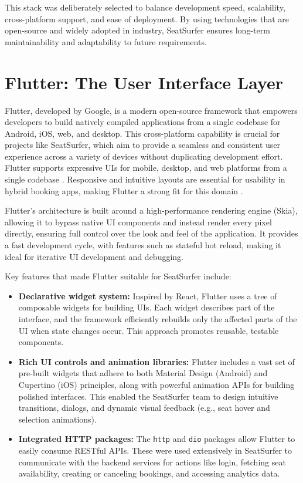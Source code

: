 \documentclass[12pt,a4paper]{report} %
\begin{document}
This stack was deliberately selected to balance development speed, scalability, cross-platform support, and ease of deployment. By using technologies that are open-source and widely adopted in industry, SeatSurfer ensures long-term maintainability and adaptability to future requirements.

\section{Flutter: The User Interface Layer}

Flutter, developed by Google, is a modern open-source framework that empowers developers to build natively compiled applications from a single codebase for Android, iOS, web, and desktop. This cross-platform capability is crucial for projects like SeatSurfer, which aim to provide a seamless and consistent user experience across a variety of devices without duplicating development effort. Flutter supports expressive UIs for mobile, desktop, and web platforms from a single codebase \cite{google2022flutter}. Responsive and intuitive layouts are essential for usability in hybrid booking apps, making Flutter a strong fit for this domain \cite{verma2023flutter}.

Flutter's architecture is built around a high-performance rendering engine (Skia), allowing it to bypass native UI components and instead render every pixel directly, ensuring full control over the look and feel of the application. It provides a fast development cycle, with features such as stateful hot reload, making it ideal for iterative UI development and debugging.

Key features that made Flutter suitable for SeatSurfer include:

\begin{itemize}
\item \textbf{Declarative widget system:} Inspired by React, Flutter uses a tree of composable widgets for building UIs. Each widget describes part of the interface, and the framework efficiently rebuilds only the affected parts of the UI when state changes occur. This approach promotes reusable, testable components.
\item \textbf{Rich UI controls and animation libraries:} Flutter includes a vast set of pre-built widgets that adhere to both Material Design (Android) and Cupertino (iOS) principles, along with powerful animation APIs for building polished interfaces. This enabled the SeatSurfer team to design intuitive transitions, dialogs, and dynamic visual feedback (e.g., seat hover and selection animations).
\item \textbf{Integrated HTTP packages:} The \texttt{http} and \texttt{dio} packages allow Flutter to easily consume RESTful APIs. These were used extensively in SeatSurfer to communicate with the backend services for actions like login, fetching seat availability, creating or canceling bookings, and accessing analytics data.
\end{itemize}
\end{document}
